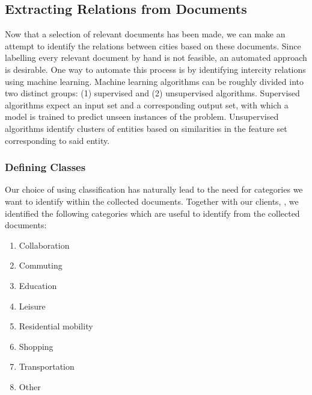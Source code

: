 \subsection{Extracting Relations from Documents}
Now that a selection of relevant documents has been made, we can make an attempt to identify the relations between cities based on these documents. Since labelling every relevant document by hand is not feasible, an automated approach is desirable. 
One way to automate this process is by identifying intercity relations using machine learning. Machine learning algorithms can be roughly divided into two distinct groups: (1) supervised and (2) unsupervised algorithms. Supervised algorithms expect an input set and a corresponding output set, with which a model is trained to predict unseen instances of the problem. Unsupervised algorithms identify clusters of entities based on similarities in the feature set corresponding to said entity.

\subsubsection{Defining Classes}
Our choice of using classification has naturally lead to the need for categories we want to identify within the collected documents. Together with our clients, , we identified the following categories which are useful to identify from the collected documents:\\

\begin{enumerate}
    \item Collaboration
    \item Commuting
    \item Education
    \item Leisure
    \item Residential mobility
    \item Shopping
    \item Transportation
    \item Other
\end{enumerate}

